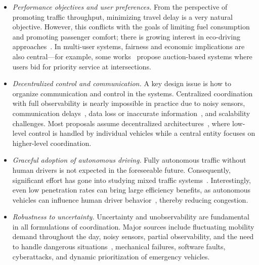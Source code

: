 \documentclass[a4paper]{report}
\theoremstyle{definition}
\theoremstyle{plain}
\begin{document}
\begin{itemize}

  \item \emph{Performance objectives and user preferences.} From the perspective of
        promoting traffic throughput, minimizing travel delay is a very natural
        objective. However, this conflicts with the goals of limiting fuel
        consumption and promoting passenger comfort; there is growing interest
        in eco-driving approaches~\cite{hadjigeorgiouEnergyConsumptionOptimization2025}.
        In multi-user systems, fairness and economic implications are also
        central---for example, some works~\cite{reyOnlineIncentiveCompatibleMechanisms2020,sayinInformationDrivenAutonomousIntersection2019} propose auction-based
        systems where users bid for priority service at intersections.
  
  \item \emph{Decentralized control and communication.} A key design issue is
        how to organize communication and control in the systems.
        Centralized coordination with full observability is nearly impossible in
        practice due to noisy sensors, communication
        delays~\cite{wangAssessingImpactCommunication2024}, data loss or
        inaccurate information~\cite{vitaleAutonomousIntersectionCrossing2022},
        and scalability challenges. Most proposals assume decentralized
        architectures~\cite{yangAutonomousDrivingV2X2022}, where low-level
        control is handled by individual vehicles while a central entity focuses
        on higher-level coordination.

  \item \emph{Graceful adoption of autonomous driving.} Fully autonomous traffic without
        human drivers is not expected in the foreseeable future. Consequently,
        significant effort has gone into studying mixed traffic
        systems~\cite{liSurveyUrbanTraffic2023}.
        Interestingly, even low penetration rates can bring large efficiency
        benefits, as autonomous vehicles can influence human driver
        behavior~\cite{wangLearningControlCoordinate2025}, thereby reducing
        congestion.

  \item \emph{Robustness to uncertainty.}
        Uncertainty and unobservability are fundamental in all
        formulations of coordination.
        Major sources include fluctuating mobility demand throughout the day,
        noisy sensors, partial observability, and the need to handle dangerous
        situations~\cite{yuUncertaintyAwareSafetyCriticalDecision2025},
        mechanical failures, software faults, cyberattacks, and dynamic
        prioritization of emergency vehicles.
\end{itemize}
\end{document}
